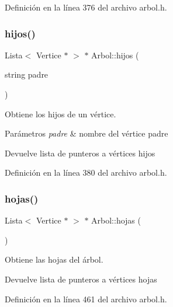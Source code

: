 Definición en la línea 376 del archivo arbol.\+h.

\mbox{\label{classArbol_ac799e737e25e07d285d2bb29ba950b5c}} 
\subsubsection{\texorpdfstring{hijos()}{hijos()}\hspace{0.1cm}{\footnotesize\ttfamily [2/2]}}
{\footnotesize\ttfamily Lista$<$ Vertice $\ast$ $>$ $\ast$ Arbol\+::hijos (\begin{DoxyParamCaption}\item[{string}]{padre }\end{DoxyParamCaption})}



Obtiene los hijos de un vértice. 


\begin{DoxyParams}{Parámetros}
{\em padre} & nombre del vértice padre \\
\hline
\end{DoxyParams}
\begin{DoxyReturn}{Devuelve}
lista de punteros a vértices hijos 
\end{DoxyReturn}


Definición en la línea 380 del archivo arbol.\+h.

\mbox{\label{classArbol_a54203315682d5c39015ae7d871223b66}} 
\subsubsection{\texorpdfstring{hojas()}{hojas()}}
{\footnotesize\ttfamily Lista$<$ Vertice $\ast$ $>$ $\ast$ Arbol\+::hojas (\begin{DoxyParamCaption}{ }\end{DoxyParamCaption})}



Obtiene las hojas del árbol. 

\begin{DoxyReturn}{Devuelve}
lista de punteros a vértices hojas 
\end{DoxyReturn}


Definición en la línea 461 del archivo arbol.\+h.

\mbox{\label{classArbol_a80a0c3cf2d7f3e92a5c8e5504947dab5}} 
